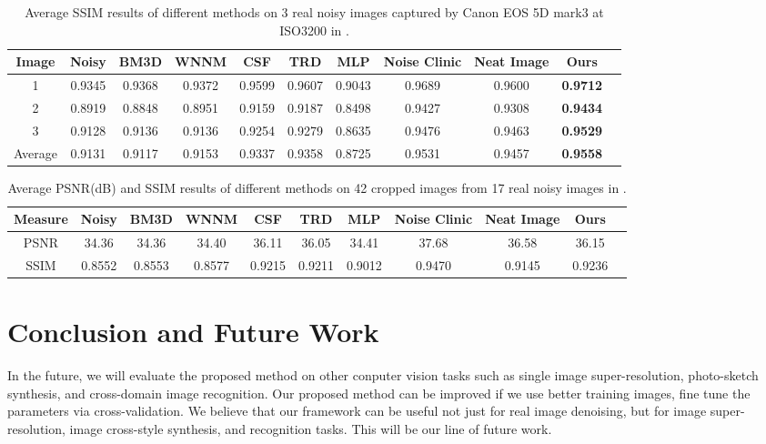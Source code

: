 \documentclass[10pt,twocolumn,letterpaper]{article}
\begin{document}
\begin{table*}
\caption{Average SSIM results of different methods on 3 real noisy images captured by Canon EOS 5D mark3 at ISO3200 in \cite{crosschannel2016}.}
\label{tab1}
\begin{center}
\renewcommand\arraystretch{1}
\begin{tabular}{|c||c|c|c|c|c|c|c|c|c|c|}
\hline
Image & \textbf{Noisy} &\textbf{BM3D}&\textbf{WNNM}&\textbf{CSF}&\textbf{TRD}&\textbf{MLP}& \textbf{Noise Clinic}& \textbf{Neat Image}&\textbf{Ours}
\\
\hline
1& 0.9345 & 0.9368  & 0.9372  & 0.9599   &  0.9607  & 0.9043   &  0.9689  & 0.9600   &\textbf{ 0.9712  }
\\
\hline
2& 0.8919 &  0.8848 &  0.8951 & 0.9159   &  0.9187  &  0.8498  &  0.9427  &  0.9308  & \textbf{ 0.9434 }
\\
\hline
3& 0.9128  & 0.9136 & 0.9136  & 0.9254   &  0.9279  &  0.8635  &  0.9476  & 0.9463   & \textbf{ 0.9529 }
\\
\hline
Average &  0.9131  & 0.9117 &  0.9153 & 0.9337   & 0.9358   &  0.8725  & 0.9531   & 0.9457   &  \textbf{0.9558} 
\\
\hline
\end{tabular}
\end{center}
\end{table*}




\begin{table*}
\caption{Average PSNR(dB) and SSIM results of different methods on 42 cropped images from 17 real noisy images in \cite{crosschannel2016}.}
\label{tab1}
\begin{center}
\renewcommand\arraystretch{1}
\begin{tabular}{|c||c|c|c|c|c|c|c|c|c|c|}
\hline
Measure & \textbf{Noisy} &\textbf{BM3D}&\textbf{WNNM}&\textbf{CSF}&\textbf{TRD}&\textbf{MLP}& \textbf{Noise Clinic}& \textbf{Neat Image}&\textbf{Ours}
\\
\hline
PSNR& 34.36 & 34.36 & 34.40 & 36.11 & 36.05 & 34.41 & 37.68 & 36.58 & 36.15
\\
\hline
SSIM& 0.8552 & 0.8553 & 0.8577 & 0.9215 & 0.9211 & 0.9012 & 0.9470 & 0.9145 & 0.9236
\\
\hline
\end{tabular}
\end{center}
\end{table*}


\section{Conclusion and Future Work}

In the future, we will evaluate the proposed method on other conputer vision tasks such as single image super-resolution, photo-sketch synthesis, and cross-domain image recognition. Our proposed method can be improved if we use better training images, fine tune the parameters via cross-validation. We believe that our framework can be useful not just for real image denoising, but for image super-resolution, image cross-style synthesis, and recognition tasks. This will be our line of future work.

{\small


}
\end{document}

